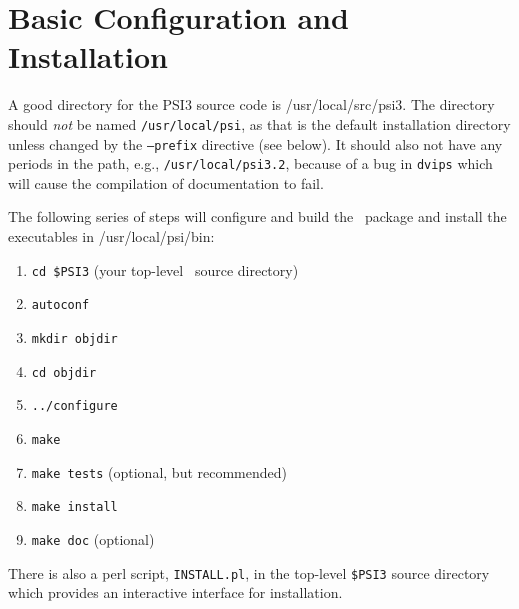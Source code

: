 \documentclass[12pt]{article}
\begin{document}
\section{Basic Configuration and Installation}

A good directory for the PSI3 source code is /usr/local/src/psi3.
The directory should {\em not} be named {\tt /usr/local/psi}, as that is
the default installation directory unless changed by the {\tt --prefix}
directive (see below).  It should also not have any periods in the path,
e.g., {\tt /usr/local/psi3.2}, because of a bug in {\tt dvips} which will
cause the compilation of documentation to fail.

The following series of steps will configure and build the \PSIthree\
package and install the executables in /usr/local/psi/bin:

\begin{enumerate}
\item {\tt cd \$PSI3} (your top-level \PSIthree\ source directory)
\item {\tt autoconf}
\item {\tt mkdir objdir}
\item {\tt cd objdir}
\item {\tt ../configure}
\item {\tt make}
\item {\tt make tests} (optional, but recommended)
\item {\tt make install}
\item {\tt make doc} (optional)
\end{enumerate}

There is also a perl script, {\tt INSTALL.pl}, in the top-level 
{\tt \$PSI3} source directory which provides an interactive interface 
for installation.
\end{document}

